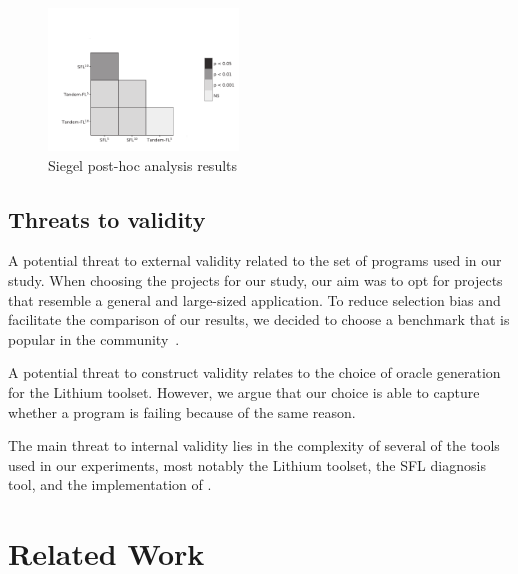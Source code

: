 \documentclass{article}
\begin{document}
\begin{figure}[h]
	\vspace{-1.2cm}
		\includegraphics[width=0.45\textwidth]{figures/heatmap_nemenyi_result.pdf}
		\caption{Siegel post-hoc analysis results}
		\label{fig:performance}
\end{figure}

\subsection{Threats to validity}


%
A potential threat to external validity related to the set of programs used in
our study. When choosing the projects for our study, our aim was to opt for
projects that resemble a general and large-sized application. To reduce
selection bias and facilitate the comparison of our results, we decided to
choose a benchmark that is popular in the community~\cite{just-defects4j-issta2014}.

A potential threat to construct validity relates to the choice of oracle generation
for the Lithium toolset. However, we argue that our choice is able to capture whether
a program is failing because of the same reason.

The main threat to internal validity lies in the complexity of several of the tools
used in our experiments, most notably the Lithium toolset, the SFL diagnosis tool,
and the implementation of \comb{}.
%
\section{Related Work}
\end{document}
